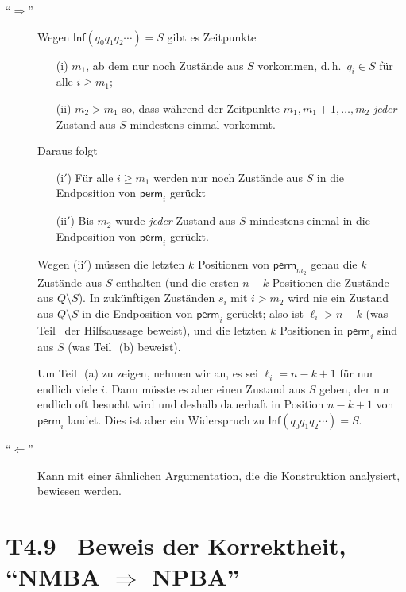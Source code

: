 \documentclass[fontsize=11pt, twoside=false, numbers=autoenddot]{scrbook}
\begin{document}
\begin{description}
  \item[{\boldmath"`$\Rightarrow$"'}]
    Wegen $\textsf{Inf}(q_0q_1q_2\cdots)=S$ gibt es Zeitpunkte
    \begin{enumerate}
      \item[(i)]
        $m_1$, ab dem nur noch Zustände aus $S$ vorkommen,
        d.\,h.\ $q_i \in S$ für alle $i \geq m_1$;
      \item[(ii)]
        $m_2 > m_1$ so, dass während der Zeitpunkte $m_1,m_1+1,\dots,m_2$
        \emph{jeder} Zustand aus $S$ mindestens einmal vorkommt.
    \end{enumerate}
    Daraus folgt
    \begin{enumerate}
      \item[(i$'$)]
        Für alle $i \geq m_1$ werden nur noch Zustände aus $S$ in die Endposition von
        $\textsf{perm}_i$ gerückt
      \item[(ii$'$)]
        Bis $m_2$ wurde \emph{jeder} Zustand aus $S$ mindestens einmal in die 
        Endposition von
        $\textsf{perm}_i$ gerückt.
    \end{enumerate}
    Wegen (ii$'$) müssen die letzten $k$ Positionen von $\textsf{perm}_{m_2}$
    genau die $k$ Zustände aus $S$ enthalten
    (und die ersten $n-k$ Positionen die Zustände aus $Q\setminus S$).
    In zukünftigen Zuständen $s_i$ mit $i > m_2$ wird
    nie ein Zustand aus $Q\setminus S$ in die Endposition von $\textsf{perm}_i$ gerückt;
    also ist $\ell_i  > n-k$ (was Teil~ der Hilfsaussage beweist),
    und die letzten $k$ Positionen in $\textsf{perm}_i$ sind aus $S$
    (was Teil~\,(b) beweist).
    
    Um Teil~\,(a) zu zeigen, nehmen wir an, es sei $\ell_i = n-k+1$
    für nur endlich viele $i$.
    Dann müsste es aber einen Zustand aus $S$ geben, der nur endlich oft besucht wird
    und deshalb dauerhaft in Position $n-k+1$ von $\textsf{perm}_i$ landet.
    Dies ist aber ein Widerspruch zu $\textsf{Inf}(q_0q_1q_2\cdots)=S$.
  \item[{\boldmath"`$\Leftarrow$"'}]
    Kann mit einer ähnlichen Argumentation,
    die die Konstruktion analysiert,
    bewiesen werden.
    \qedhere
\end{description}

\pagebreak
\section*{{\boldmath T4.9~ Beweis der Korrektheit, "`NMBA $\Rightarrow$ NPBA"'}}
\end{document}
